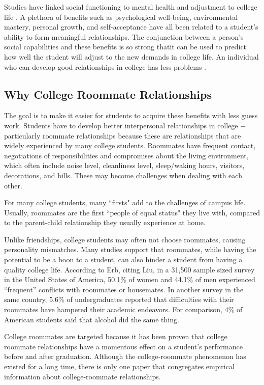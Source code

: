 \documentclass[journal]{./IEEE/IEEEtran}
\begin{document}
    Studies have linked social functioning to mental health and adjustment to college life \cite{erb}. A plethora of
    benefits such as psychological well-being, environmental mastery, personal growth, and self-acceptance have all been
    related to a student's ability to form meaningful relationships\cite{erb}. The conjunction between a person{'}s
    social capabilities and these benefits is so strong thatit can be used to predict how well the student will adjust
    to the new demands in college life. An individual who can develop good relationships in college has less problems
    \cite{erb}. 

    \subsection{Why College Roommate Relationships}
    The goal is to make it easier for students to acquire these benefits with less guess work. Students have to develop
    better interpersonal relationships in college $-$ particularly roommate relationships because these are
    relationships that are widely experienced by many college students\cite{erb}. Roommates have frequent contact,
    negotiations of responsibilities and compromises about the living environment, which often include noise level,
    cleanliness level, sleep/waking hours, visitors, decorations, and bills\cite{erb}. These may become challenges when
    dealing with each other. 

    For many college students, many {``firsts"} add to the challenges of campus life. Usually, roommates are the first
    {``people of equal status"} they live with, compared to the parent-child relationship they usually experience at
    home\cite{erb}.

    Unlike friendships, college students may often not choose roommates, causing personality mismatches. Many studies
    support that roommates, while having the potential to be a boon to a student, can also hinder a student from having
    a quality college life. According to Erb\cite{erb}, citing Liu\cite{liu}, in a 31,500 sample sized survey in the
    United States of America, 50.1\% of women and 44.1\% of men experienced “frequent” conflicts with roommates or
    housemates. In another survey in the same country, 5.6\% of undergraduates reported that difficulties with their
    roommates have hampered their academic endeavors\cite{erb}. For comparison, 4\% of American students said that
    alcohol did the same thing\cite{erb}.

    College roommates are targeted because it has been proven that college roommate relationships have a momentous
    effect on a student's performance before and after graduation. Although the college-roommate phenomenon has existed
    for a long time, there is only one paper that congregates empirical information about college-roommate
    relationships\cite{erb}. 
\end{document}
